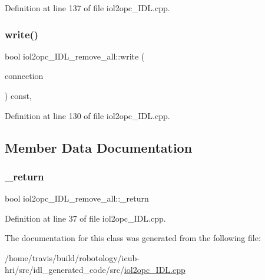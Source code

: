 Definition at line 137 of file iol2opc\+\_\+\+I\+D\+L.\+cpp.

\mbox{\label{classiol2opc__IDL__remove__all_a3983e57c2d1d0b6020fdc8d7c829b695}} 
\subsubsection{\texorpdfstring{write()}{write()}}
{\footnotesize\ttfamily bool iol2opc\+\_\+\+I\+D\+L\+\_\+remove\+\_\+all\+::write (\begin{DoxyParamCaption}\item[{yarp\+::os\+::\+Connection\+Writer \&}]{connection }\end{DoxyParamCaption}) const\hspace{0.3cm}{\ttfamily [override]}, {\ttfamily [virtual]}}



Definition at line 130 of file iol2opc\+\_\+\+I\+D\+L.\+cpp.



\subsection{Member Data Documentation}
\mbox{\label{classiol2opc__IDL__remove__all_a7af589782057ac11123c5b56d07bac7b}} 
\subsubsection{\texorpdfstring{\+\_\+return}{\_return}}
{\footnotesize\ttfamily bool iol2opc\+\_\+\+I\+D\+L\+\_\+remove\+\_\+all\+::\+\_\+return}



Definition at line 37 of file iol2opc\+\_\+\+I\+D\+L.\+cpp.



The documentation for this class was generated from the following file\+:\begin{DoxyCompactItemize}
\item 
/home/travis/build/robotology/icub-\/hri/src/idl\+\_\+generated\+\_\+code/src/\hyperlink{iol2opc__IDL_8cpp}{iol2opc\+\_\+\+I\+D\+L.\+cpp}\end{DoxyCompactItemize}
